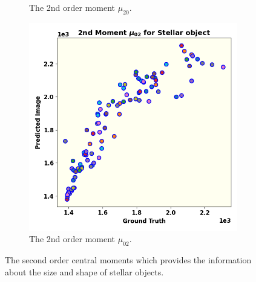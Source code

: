 \begin{figure}
\begin{subfigure}{0.33\linewidth}
		\caption{The 2nd order moment $\mu_{20}$.}
		\label{fig:mom5}
	\end{subfigure}\hfill
	\begin{subfigure}{0.33\linewidth}
		\includegraphics[width=\linewidth]{fig/moments/mom5.png}
		\caption{The 2nd order moment $\mu_{02}$.}
		\label{fig:mom6}
	\end{subfigure}\hfill
	\caption{The second order central moments which provides the information about the size and shape of stellar objects.}
	\label{fig:struc}
\end{figure}
